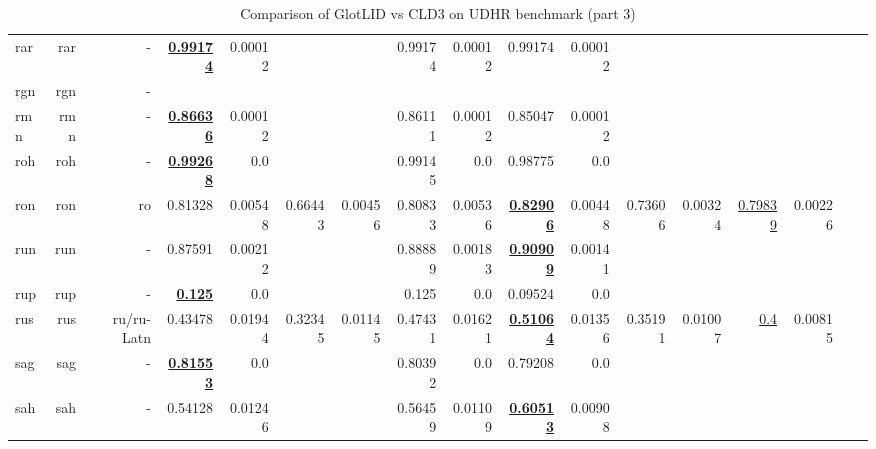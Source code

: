 \documentclass[11pt]{article}
\def\udhr{UDHR\xspace}
\begin{document}
\begin{table*}[h]
{\begin{tabular}{lrrrrrrrrrrrrrrrr}
rar         & rar         & -         & \textbf{\underline{0.99174}}         & 0.00012         &          &          & 0.99174         & 0.00012         & 0.99174         & 0.00012         &          &          &          &          \\
rgn         & rgn         & -         &          &          &          &          &          &          &          &          &          &          &          &          \\
rmn         & rmn         & -         & \textbf{\underline{0.86636}}         & 0.00012         &          &          & 0.86111         & 0.00012         & 0.85047         & 0.00012         &          &          &          &          \\
roh         & roh         & -         & \textbf{\underline{0.99268}}         & 0.0         &          &          & 0.99145         & 0.0         & 0.98775         & 0.0         &          &          &          &          \\
ron         & ron         & ro         & 0.81328         & 0.00548         & 0.66443         & 0.00456         & 0.80833         & 0.00536         & \textbf{\underline{0.82906}}         & 0.00448         & 0.73606         & 0.00324         & \underline{0.79839}         & 0.00226         \\
run         & run         & -         & 0.87591         & 0.00212         &          &          & 0.88889         & 0.00183         & \textbf{\underline{0.90909}}         & 0.00141         &          &          &          &          \\
rup         & rup         & -         & \textbf{\underline{0.125}}         & 0.0         &          &          & 0.125         & 0.0         & 0.09524         & 0.0         &          &          &          &          \\
rus         & rus         & ru/ru-Latn         & 0.43478         & 0.01944         & 0.32345         & 0.01145         & 0.47431         & 0.01621         & \textbf{\underline{0.51064}}         & 0.01356         & 0.35191         & 0.01007         & \underline{0.4}         & 0.00815         \\
sag         & sag         & -         & \textbf{\underline{0.81553}}         & 0.0         &          &          & 0.80392         & 0.0         & 0.79208         & 0.0         &          &          &          &          \\
sah         & sah         & -         & 0.54128         & 0.01246         &          &          & 0.56459         & 0.01109         & \textbf{\underline{0.60513}}         & 0.00908         &          &          &          &          \\
\end{tabular}
}
\caption{Comparison of GlotLID vs CLD3 on \udhr benchmark (part 3)}
\label{tab:appendix_glotlid_cld3_udhr_3}
\end{table*}
\end{document}
